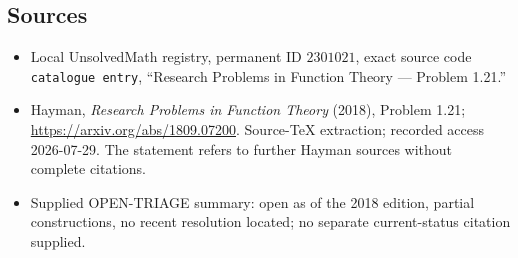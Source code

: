 \documentclass[11pt]{article}
\begin{document}
\subsection{Sources}
\begin{itemize}
\item Local UnsolvedMath registry, permanent ID \(2301021\), exact source code \texttt{catalogue entry}, ``Research Problems in Function Theory --- Problem 1.21.''
\item Hayman, \emph{Research Problems in Function Theory} (2018), Problem 1.21; \url{https://arxiv.org/abs/1809.07200}. Source-TeX extraction; recorded access 2026-07-29. The statement refers to further Hayman sources without complete citations.
\item Supplied OPEN-TRIAGE summary: open as of the 2018 edition, partial constructions, no recent resolution located; no separate current-status citation supplied.
\end{itemize}
\end{document}
